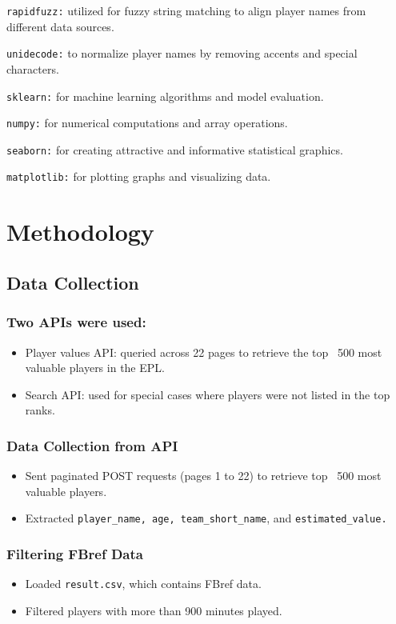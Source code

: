 \documentclass[12pt,a4paper]{report}
\begin{document}
   \texttt{rapidfuzz:} utilized for fuzzy string matching to align player names from different data sources.
   
   \texttt{unidecode:} to normalize player names by removing accents and special characters.
   
   \texttt{sklearn:} for machine learning algorithms and model evaluation.
   
   \texttt{numpy:} for numerical computations and array operations.
   
   \texttt{seaborn:} for creating attractive and informative statistical graphics.
   
   \texttt{matplotlib:} for plotting graphs and visualizing data.

\section{Methodology}
\subsection{Data Collection}
\subsubsection{Two APIs were used:}
\begin{itemize}
    \item Player values API: queried across 22 pages to retrieve the top ~500 most valuable players in the EPL.
    \item Search API: used for special cases where players were not listed in the top ranks.
\end{itemize}

\subsubsection{Data Collection from API}
\begin{itemize}
    \item Sent paginated POST requests (pages 1 to 22) to retrieve top ~500 most valuable players.
    \item Extracted \texttt{player\_name, age, team\_short\_name}, and \texttt{estimated\_value.}
\end{itemize}

\subsubsection{Filtering FBref Data}
\begin{itemize}
    \item Loaded \texttt{result.csv}, which contains FBref data.
    \item Filtered players with more than 900 minutes played.
\end{itemize}
\end{document}
